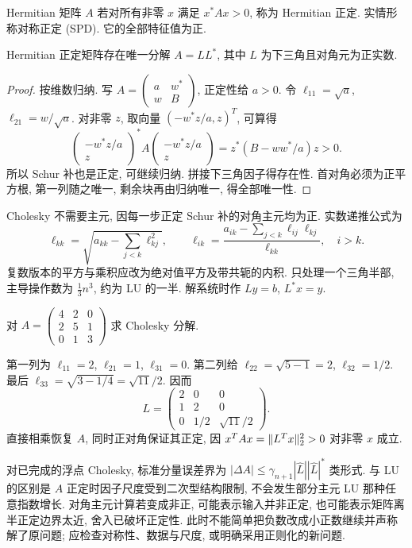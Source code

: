 \begin{definition}
Hermitian 矩阵 $A$ 若对所有非零 $x$ 满足 $x^*Ax>0$, 称为 Hermitian 正定. 实情形称对称正定 (SPD). 它的全部特征值为正.
\end{definition}
\begin{theorem}[Cholesky 分解]\label{thm:chol}
Hermitian 正定矩阵存在唯一分解 $A=LL^*$, 其中 $L$ 为下三角且对角元为正实数.
\end{theorem}
\begin{proof}
按维数归纳. 写 $A=\begin{pmatrix}a&w^*\\w&B\end{pmatrix}$, 正定性给 $a>0$. 令 $\ell_{11}=\sqrt a$, $\ell_{21}=w/\sqrt a$. 对非零 $z$, 取向量 $(-w^*z/a,z)^T$, 可算得
\[
\begin{pmatrix}-w^*z/a\\z\end{pmatrix}^{\!*}
A\begin{pmatrix}-w^*z/a\\z\end{pmatrix}
=z^*(B-ww^*/a)z>0.
\]
所以 Schur 补也是正定, 可继续归纳. 拼接下三角因子得存在性. 首对角必须为正平方根, 第一列随之唯一, 剩余块再由归纳唯一, 得全部唯一性.
\end{proof}
Cholesky 不需要主元, 因每一步正定 Schur 补的对角主元均为正. 实数递推公式为
\[
\ell_{kk}=\sqrt{a_{kk}-\sum_{j<k}\ell_{kj}^2},\qquad
\ell_{ik}=\frac{a_{ik}-\sum_{j<k}\ell_{ij}\ell_{kj}}{\ell_{kk}},\quad i>k.
\]
复数版本的平方与乘积应改为绝对值平方及带共轭的内积. 只处理一个三角半部, 主导操作数为 $\tfrac13n^3$, 约为 LU 的一半. 解系统时作 $Ly=b$, $L^*x=y$.

\begin{example}
对 $A=\begin{pmatrix}4&2&0\\2&5&1\\0&1&3\end{pmatrix}$ 求 Cholesky 分解.
\end{example}
\begin{solution}
第一列为 $\ell_{11}=2$, $\ell_{21}=1$, $\ell_{31}=0$. 第二列给 $\ell_{22}=\sqrt{5-1}=2$, $\ell_{32}=1/2$. 最后 $\ell_{33}=\sqrt{3-1/4}=\sqrt{11}/2$. 因而
\[
L=\begin{pmatrix}2&0&0\\1&2&0\\0&1/2&\sqrt{11}/2\end{pmatrix}.
\]
直接相乘恢复 $A$, 同时正对角保证其正定, 因 $x^TAx=\lVert L^Tx\rVert_2^2>0$ 对非零 $x$ 成立.
\end{solution}
对已完成的浮点 Cholesky, 标准分量误差界为 $|\Delta A|\le\gamma_{n+1}|\widehat L||\widehat L|^*$ 类形式. 与 LU 的区别是 $A$ 正定时因子尺度受到二次型结构限制, 不会发生部分主元 LU 那种任意指数增长. 对角主元计算若变成非正, 可能表示输入并非正定, 也可能表示矩阵离半正定边界太近, 舍入已破坏正定性. 此时不能简单把负数改成小正数继续并声称解了原问题; 应检查对称性、数据与尺度, 或明确采用正则化的新问题.

